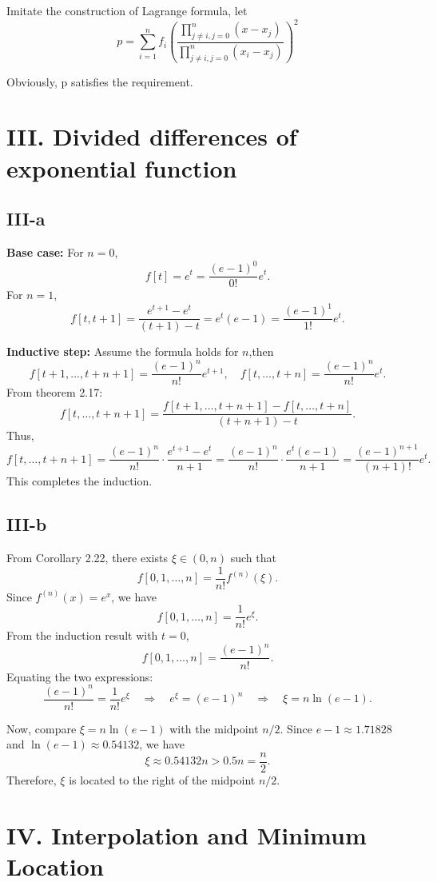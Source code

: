 \documentclass[a4paper]{article}
\begin{document}
Imitate the construction of Lagrange formula, let $$p = \sum_{i = 1}^{n}f_i \left(\dfrac{\prod\limits_{j \neq i, j = 0}^{n}(x - x_j)}{\prod\limits_{j \neq i, j = 0}^{n}(x_i - x_j)}\right)^2$$

Obviously, p satisfies the requirement.

\section*{III. Divided differences of exponential function}

\subsection*{III-a}

\textbf{Base case:} For \( n = 0 \), 
\[
f[t] = e^t = \frac{(e-1)^0}{0!} e^t.
\]
For \( n = 1 \),
\[
f[t, t+1] = \frac{e^{t+1} - e^t}{(t+1) - t} = e^t(e - 1) = \frac{(e-1)^1}{1!} e^t.
\]

\textbf{Inductive step:} Assume the formula holds for \( n \),then 
\[
f[t+1, \ldots, t+n+1] = \frac{(e-1)^n}{n!} e^{t+1}, \quad f[t, \ldots, t+n] = \frac{(e-1)^n}{n!} e^t.
\]
From theorem 2.17:
\[
f[t, \ldots, t+n+1] = \frac{f[t+1, \ldots, t+n+1] - f[t, \ldots, t+n]}{(t+n+1) - t}.
\]
Thus,
\[
f[t, \ldots, t+n+1] = \frac{(e-1)^n}{n!} \cdot \frac{e^{t+1} - e^t}{n+1} = \frac{(e-1)^n}{n!} \cdot \frac{e^t(e - 1)}{n+1} = \frac{(e-1)^{n+1}}{(n+1)!} e^t.
\]
This completes the induction.

\subsection*{III-b}

From Corollary 2.22, there exists \( \xi \in (0, n) \) such that
\[
f[0, 1, \ldots, n] = \frac{1}{n!} f^{(n)}(\xi).
\]
Since \( f^{(n)}(x) = e^x \), we have
\[
f[0, 1, \ldots, n] = \frac{1}{n!} e^\xi.
\]
From the induction result with \( t = 0 \),
\[
f[0, 1, \ldots, n] = \frac{(e - 1)^n}{n!}.
\]
Equating the two expressions:
\[
\frac{(e - 1)^n}{n!} = \frac{1}{n!} e^\xi \quad \Rightarrow \quad e^\xi = (e - 1)^n \quad \Rightarrow \quad \xi = n \ln(e - 1).
\]

Now, compare \( \xi = n \ln(e - 1) \) with the midpoint \( n/2 \). Since \( e - 1 \approx 1.71828 \) and \( \ln(e - 1) \approx 0.54132 \), we have
\[
\xi \approx 0.54132n > 0.5n = \frac{n}{2}.
\]
Therefore, \( \xi \) is located to the right of the midpoint \( n/2 \).

\section*{IV. Interpolation and Minimum Location}
\end{document}
